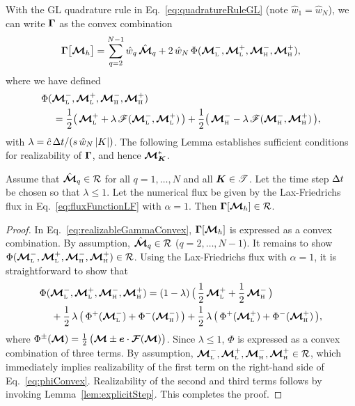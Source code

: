 With the GL quadrature rule in Eq.~\eqref{eq:quadratureRuleGL} (note $\hat{w}_{1}=\hat{w}_{N}$), we can write $\boldsymbol{\Gamma}$ as the convex combination
\begin{equation}
  \boldsymbol{\Gamma}\big[\boldsymbol{\mathcal{M}}_{h}\big]
  =\sum_{q=2}^{N-1}\hat{w}_{q}\,\hat{\boldsymbol{\mathcal{M}}}_{q}
  +2\,\hat{w}_{N}\,\Phi(\boldsymbol{\mathcal{M}}_{\mbox{\tiny L}}^{-},\boldsymbol{\mathcal{M}}_{\mbox{\tiny L}}^{+},\boldsymbol{\mathcal{M}}_{\mbox{\tiny H}}^{-},\boldsymbol{\mathcal{M}}_{\mbox{\tiny H}}^{+}),
  \label{eq:realizableGammaConvex}
\end{equation}
where we have defined
\begin{align}
  &\Phi(\boldsymbol{\mathcal{M}}_{\mbox{\tiny L}}^{-},\boldsymbol{\mathcal{M}}_{\mbox{\tiny L}}^{+},\boldsymbol{\mathcal{M}}_{\mbox{\tiny H}}^{-},\boldsymbol{\mathcal{M}}_{\mbox{\tiny H}}^{+}) \nonumber \\
  &\hspace{12pt}
  =\frac{1}{2}\big(\,\boldsymbol{\mathcal{M}}_{\mbox{\tiny L}}^{+}+\lambda\,\mathscr{F}(\boldsymbol{\mathcal{M}}_{\mbox{\tiny L}}^{-},\boldsymbol{\mathcal{M}}_{\mbox{\tiny L}}^{+})\,\big)
  +\frac{1}{2}\big(\,\boldsymbol{\mathcal{M}}_{\mbox{\tiny H}}^{-}-\lambda\,\mathscr{F}(\boldsymbol{\mathcal{M}}_{\mbox{\tiny H}}^{-},\boldsymbol{\mathcal{M}}_{\mbox{\tiny H}}^{+})\,\big),
\end{align}
with $\lambda=\hat{c}\,\Delta t/(s\,\hat{w}_{N}\,|K|)$.  
The following Lemma establishes sufficient conditions for realizability of $\boldsymbol{\Gamma}$, and hence $\boldsymbol{\mathcal{M}}_{\boldsymbol{K}}^{*}$.  
\begin{lemma}
  Assume that $\hat{\boldsymbol{\mathcal{M}}}_{q}\in\mathcal{R}$ for all $q=1,\ldots,N$ and all $\boldsymbol{K}\in\mathscr{T}$.  
  Let the time step $\Delta t$ be chosen so that $\lambda\le1$.  
  Let the numerical flux be given by the Lax-Friedrichs flux in Eq.~\eqref{eq:fluxFunctionLF} with $\alpha=1$.  
  Then $\boldsymbol{\Gamma}[\boldsymbol{\mathcal{M}}_{h}]\in\mathcal{R}$.  
\end{lemma}
\begin{proof}
  In Eq.~\eqref{eq:realizableGammaConvex}, $\boldsymbol{\Gamma}[\boldsymbol{\mathcal{M}}_{h}]$ is expressed as a convex combination.  
  By assumption, $\hat{\boldsymbol{\mathcal{M}}}_{q}\in\mathcal{R}$ ($q=2,\ldots,N-1$).  
  It remains to show $\Phi(\boldsymbol{\mathcal{M}}_{\mbox{\tiny L}}^{-},\boldsymbol{\mathcal{M}}_{\mbox{\tiny L}}^{+},\boldsymbol{\mathcal{M}}_{\mbox{\tiny H}}^{-},\boldsymbol{\mathcal{M}}_{\mbox{\tiny H}}^{+})\in\mathcal{R}$.  
  Using the Lax-Friedrichs flux with $\alpha=1$, it is straightforward to show that
  \begin{align}
    &\Phi(\boldsymbol{\mathcal{M}}_{\mbox{\tiny L}}^{-},\boldsymbol{\mathcal{M}}_{\mbox{\tiny L}}^{+},\boldsymbol{\mathcal{M}}_{\mbox{\tiny H}}^{-},\boldsymbol{\mathcal{M}}_{\mbox{\tiny H}}^{+})
    =(1-\lambda)\,\big(\,\frac{1}{2}\,\boldsymbol{\mathcal{M}}_{\mbox{\tiny L}}^{+}+\frac{1}{2}\,\boldsymbol{\mathcal{M}}_{\mbox{\tiny H}}^{-}\,\big) \nonumber \\
    &\hspace{12pt}
    +\frac{1}{2}\,\lambda\,\big(\,\Phi^{+}(\boldsymbol{\mathcal{M}}_{\mbox{\tiny L}}^{-})+\Phi^{-}(\boldsymbol{\mathcal{M}}_{\mbox{\tiny H}}^{-})\,\big)
    +\frac{1}{2}\,\lambda\,\big(\,\Phi^{+}(\boldsymbol{\mathcal{M}}_{\mbox{\tiny L}}^{+})+\Phi^{-}(\boldsymbol{\mathcal{M}}_{\mbox{\tiny H}}^{+})\,\big),
    \label{eq:phiConvex}
  \end{align}
  where $\Phi^{\pm}(\boldsymbol{\mathcal{M}})=\frac{1}{2}\,\big(\boldsymbol{\mathcal{M}}\pm\boldsymbol{e}\cdot\boldsymbol{\mathcal{F}}(\boldsymbol{\mathcal{M}})\big)$.  
  Since $\lambda\le1$, $\Phi$ is expressed as a convex combination of three terms.  
  By assumption, $\boldsymbol{\mathcal{M}}_{\mbox{\tiny L}}^{-},\boldsymbol{\mathcal{M}}_{\mbox{\tiny L}}^{+},\boldsymbol{\mathcal{M}}_{\mbox{\tiny H}}^{-},\boldsymbol{\mathcal{M}}_{\mbox{\tiny H}}^{+}\in\mathcal{R}$, which immediately implies realizability of the first term on the right-hand side of Eq.~\eqref{eq:phiConvex}.  
  Realizability of the second and third terms follows by invoking Lemma~\ref{lem:explicitStep}.  
  This completes the proof.  
\end{proof}